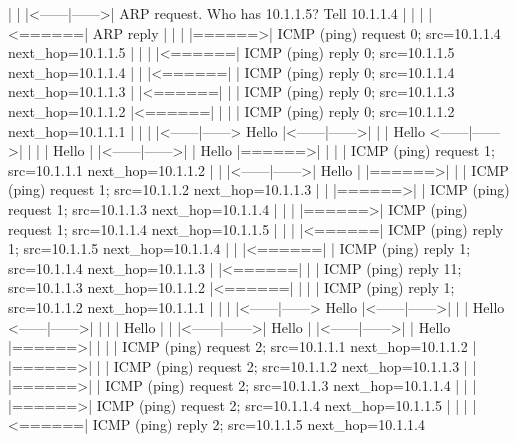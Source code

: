\begin{DoxyVerb}
           |       |       |<------|------>|        ARP request. Who has 10.1.1.5? Tell 10.1.1.4
           |       |       |       |<======|        ARP reply
           |       |       |       |======>|        ICMP (ping) request 0; src=10.1.1.4 next_hop=10.1.1.5
           |       |       |       |<======|        ICMP (ping) reply 0; src=10.1.1.5 next_hop=10.1.1.4
           |       |       |<======|       |        ICMP (ping) reply 0; src=10.1.1.4 next_hop=10.1.1.3
           |       |<======|       |       |        ICMP (ping) reply 0; src=10.1.1.3 next_hop=10.1.1.2
           |<======|       |       |       |        ICMP (ping) reply 0; src=10.1.1.2 next_hop=10.1.1.1
           |       |       |       |<------|------> Hello
           |<------|------>|       |       |        Hello
    <------|------>|       |       |       |        Hello
           |       |<------|------>|       |        Hello
           |======>|       |       |       |        ICMP (ping) request 1; src=10.1.1.1 next_hop=10.1.1.2
           |       |       |<------|------>|        Hello
           |       |======>|       |       |        ICMP (ping) request 1; src=10.1.1.2 next_hop=10.1.1.3
           |       |       |======>|       |        ICMP (ping) request 1; src=10.1.1.3 next_hop=10.1.1.4
           |       |       |       |======>|        ICMP (ping) request 1; src=10.1.1.4 next_hop=10.1.1.5
           |       |       |       |<======|        ICMP (ping) reply 1; src=10.1.1.5 next_hop=10.1.1.4
           |       |       |<======|       |        ICMP (ping) reply 1; src=10.1.1.4 next_hop=10.1.1.3
           |       |<======|       |       |        ICMP (ping) reply 11; src=10.1.1.3 next_hop=10.1.1.2
           |<======|       |       |       |        ICMP (ping) reply 1; src=10.1.1.2 next_hop=10.1.1.1
           |       |       |       |<------|------> Hello
           |<------|------>|       |       |        Hello
    <------|------>|       |       |       |        Hello
           |       |       |<------|------>|        Hello
           |       |<------|------>|       |        Hello
           |======>|       |       |       |        ICMP (ping) request 2; src=10.1.1.1 next_hop=10.1.1.2
           |       |======>|       |       |        ICMP (ping) request 2; src=10.1.1.2 next_hop=10.1.1.3
           |       |       |======>|       |        ICMP (ping) request 2; src=10.1.1.3 next_hop=10.1.1.4
           |       |       |       |======>|        ICMP (ping) request 2; src=10.1.1.4 next_hop=10.1.1.5
           |       |       |       |<======|        ICMP (ping) reply 2; src=10.1.1.5 next_hop=10.1.1.4

\end{DoxyVerb}
